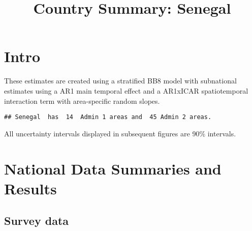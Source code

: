 \documentclass[
]{article}
\title{Country Summary: Senegal}
\author{}
\date{\vspace{-2.5em}}
\begin{document}
\maketitle

{
\setcounter{tocdepth}{2}
\tableofcontents
}
\hypertarget{intro}{%
\section{Intro}\label{intro}}

These estimates are created using a stratified BB8 model with
subnational estimates using a AR1 main temporal effect and a AR1xICAR
spatiotemporal interaction term with area-specific random slopes.

\par

\begin{verbatim}
## Senegal  has  14  Admin 1 areas and  45 Admin 2 areas.
\end{verbatim}

All uncertainty intervals displayed in subsequent figures are 90\%
intervals.

\hypertarget{national-data-summaries-and-results}{%
\section{National Data Summaries and
Results}\label{national-data-summaries-and-results}}

\hypertarget{survey-data}{%
\subsection{Survey data}\label{survey-data}}
\end{document}
